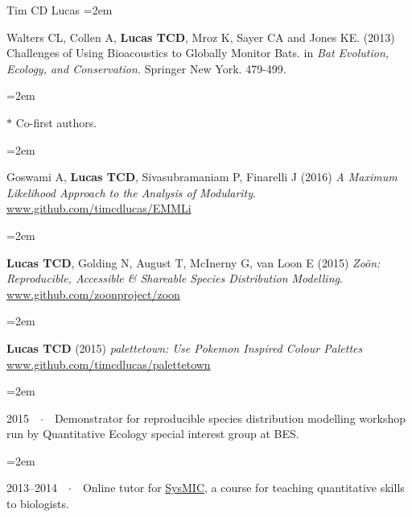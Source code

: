 \documentclass{scrartcl}
\newcommand{\MarginText}[1]{\marginpar{\raggedleft\itshape\small#1}} %
\newcommand{\Description}[1]{\hangindent=2em\hangafter=0\noindent\raggedright\footnotesize{#1}\par\normalsize\vspace{1em}} %
\begin{document}
\begin{cv}{Tim {\Large CD} Lucas}
\Description{\MarginText{2013}Walters CL, Collen A, {\bf Lucas TCD}, Mroz K, Sayer CA and Jones KE. (2013) Challenges of Using Bioacoustics to Globally Monitor Bats. in \emph{Bat Evolution, Ecology, and Conservation.} Springer New York. 479-499.}

\Description{\MarginText{} \scriptsize{ $\ast$ Co-first authors. } }


\vspace{1em} %



{\color{Maroon}}\vspace{1em}

\Description{\MarginText{On CRAN}Goswami A, {\bf Lucas TCD}, Sivasubramaniam P, Finarelli J (2016) \emph{A Maximum Likelihood Approach to the Analysis of Modularity}. \url{www.github.com/timcdlucas/EMMLi}}

\Description{{\bf Lucas TCD}, Golding N, August T, McInerny G, van Loon E (2015) \emph{Zo\"{o}n: Reproducible, Accessible \& Shareable Species Distribution Modelling}. \url{www.github.com/zoonproject/zoon}}

\Description{{\bf Lucas TCD} (2015) \emph{palettetown: Use Pokemon Inspired Colour Palettes} \url{www.github.com/timcdlucas/palettetown}}


\vspace{1em} %

{\color{Maroon}}\vspace{1em}

\Description{2015\ \ $\cdotp$\ \ Demonstrator for reproducible species distribution modelling workshop run by Quantitative Ecology special interest group at BES.}
\vspace{-0.5em} %

\Description{2013--2014\ \ $\cdotp$\ \ Online tutor for \href{http://sysmic.ac.uk/home.html}{{\footnotesize SysMIC}}, a course for teaching quantitative skills to biologists.}

\vspace{1em} %



\end{cv}
\end{document}
